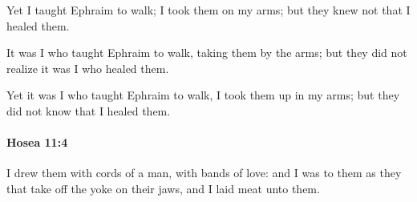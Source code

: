 			\begin{versebox}
					\item[BHS] 
					\item[LXX] 
					\item[ASV] Yet I taught Ephraim to walk; I took them on my arms; but they knew not that I healed them.
					\item[NIV] It was I who taught Ephraim to walk, taking them by the arms; but they did not realize it was I who healed them.
					\item[NRSV] Yet it was I who taught Ephraim to walk, I took them up in my arms; but they did not know that I healed them.
			\end{versebox}

		\paragraph{Hosea 11:4} %
			\label{HOSEA-11-4}

			I drew them with cords of a man, with bands of love: and I was to them as they that take off the yoke on their jaws, and I laid meat unto them.

